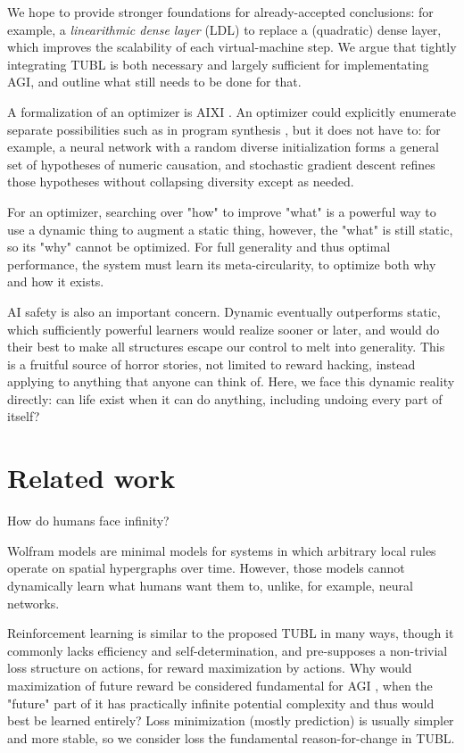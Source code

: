 \documentclass{article}
\begin{document}
We hope to provide stronger foundations for already-accepted conclusions: for example, a \textit{linearithmic dense layer} (LDL) to replace a (quadratic) dense layer, which improves the scalability of each virtual-machine step. We argue that tightly integrating TUBL is both necessary and largely sufficient for implementating AGI, and outline what still needs to be done for that.

A formalization of an optimizer is AIXI \cite{DBLP:journals/corr/cs-AI-0004001}. An optimizer could explicitly enumerate separate possibilities such as in program synthesis \cite{ellis2020dreamcoder}, but it does not have to: for example, a neural network with a random diverse initialization \cite{mellor2021neural} forms a general set of hypotheses of numeric causation, and stochastic gradient descent refines those hypotheses without collapsing diversity except as needed.

For an optimizer, searching over "how" to improve "what" is a powerful way to use a dynamic thing to augment a static thing, however, the "what" is still static, so its "why" cannot be optimized. For full generality and thus optimal performance, the system must learn its meta-circularity, to optimize both why and how it exists.

AI safety is also an important concern. Dynamic eventually outperforms static, which sufficiently powerful learners would realize sooner or later, and would do their best to make all structures escape our control to melt into generality. This is a fruitful source of horror stories, not limited to reward hacking, instead applying to anything that anyone can think of. Here, we face this dynamic reality directly: can life exist when it can do anything, including undoing every part of itself?

\section{Related work}

How do humans face infinity?

Wolfram models \cite{Wolfram_2020} are minimal models for systems in which arbitrary local rules operate on spatial hypergraphs over time. However, those models cannot dynamically learn what humans want them to, unlike, for example, neural networks.

Reinforcement learning is similar to the proposed TUBL in many ways, though it commonly lacks efficiency and self-determination, and pre-supposes a non-trivial loss structure on actions, for reward maximization by actions. Why would maximization of future reward be considered fundamental for AGI \cite{SILVER2021103535}, when the "future" part of it has practically infinite potential complexity and thus would best be learned entirely? Loss minimization (mostly prediction) is usually simpler and more stable, so we consider loss the fundamental reason-for-change in TUBL.
\end{document}
